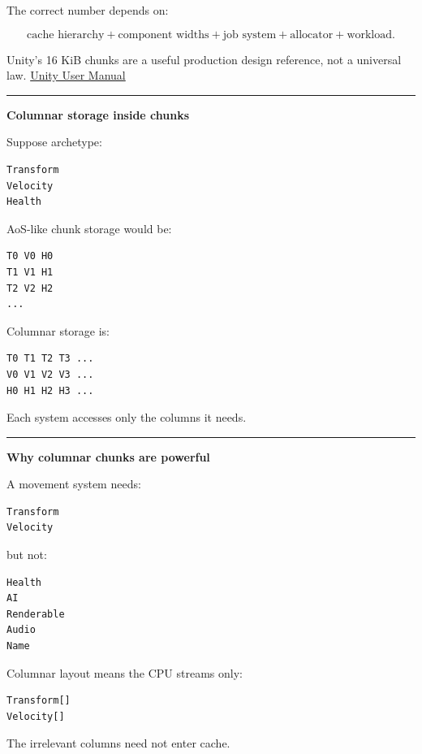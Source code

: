 The correct number depends on:

\[
\text{cache hierarchy}
+
\text{component widths}
+
\text{job system}
+
\text{allocator}
+
\text{workload}.
\]

Unity's 16 KiB chunks are a useful production design reference, not a universal law. \href{https://docs.unity.cn/Packages/com.unity.entities\%401.0/manual/concepts-archetypes.html?utm_source=chatgpt.com}{Unity User Manual}

\begin{center}\rule{0.5\linewidth}{0.5pt}\end{center}

\textbf{Columnar storage inside chunks}

Suppose archetype:

\begin{verbatim}
Transform
Velocity
Health
\end{verbatim}

AoS-like chunk storage would be:

\begin{verbatim}
T0 V0 H0
T1 V1 H1
T2 V2 H2
...
\end{verbatim}

Columnar storage is:

\begin{verbatim}
T0 T1 T2 T3 ...
V0 V1 V2 V3 ...
H0 H1 H2 H3 ...
\end{verbatim}

Each system accesses only the columns it needs.

\begin{center}\rule{0.5\linewidth}{0.5pt}\end{center}

\textbf{Why columnar chunks are powerful}

A movement system needs:

\begin{verbatim}
Transform
Velocity
\end{verbatim}

but not:

\begin{verbatim}
Health
AI
Renderable
Audio
Name
\end{verbatim}

Columnar layout means the CPU streams only:

\begin{verbatim}
Transform[]
Velocity[]
\end{verbatim}

The irrelevant columns need not enter cache.


